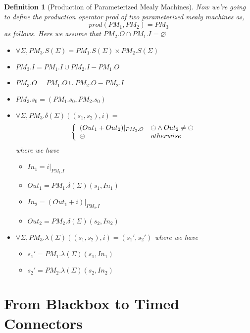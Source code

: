 \documentclass[conference, a4paper]{IEEEtran}
\newtheorem{definition}{Definition}
\newcommand{\rblock}[0]{\circleddash}
\begin{document}
\begin{definition}[Production of Parameterized Mealy Machines]
  Now we're going to define the production operator \emph{prod} of two parameterized mealy machines as,
  \[
  prod(PM_1,PM_2)=PM_3
  \]
  as follows. Here we assume that $PM_2.O\cap PM_1.I=\varnothing$
  \begin{itemize}
  	\item[-] $\forall\Sigma, PM_3.S(\Sigma)=PM_1.S(\Sigma)\times PM_2.S(\Sigma)$
    \item[-] $PM_3.I=PM_1.I\cup PM_2.I-PM_1.O$
    \item[-] $PM_3.O=PM_1.O\cup PM_2.O-PM_2.I$
    \item[-] $PM_3.s_0=(PM_1.s_0, PM_2.s_0)$
    \item[-] $\forall\Sigma, PM_3.\delta(\Sigma)((s_1,s_2), i)=$
      \begin{displaymath}
        \left\{
        \begin{array}[h]{ll}
          (Out_1 + Out_2)|_{PM_3.O} & \rblock\land Out_2\neq\rblock \\
          \rblock & otherwise \\
        \end{array}
        \right.
      \end{displaymath}
      where we have
      \begin{itemize}
        \item[*] $In_1 = i|_{PM_1.I}$
        \item[*] $Out_1 = PM_1.\delta(\Sigma)(s_1,In_1)$
        \item[*] $In_2 = (Out_1 + i)|_{PM_2.I}$
        \item[*] $Out_2 = PM_2.\delta(\Sigma)(s_2,In_2)$
      \end{itemize}
    \item[-] $\forall\Sigma, PM_3.\lambda(\Sigma)((s_1,s_2),i)=(s_1',s_2')$
      where we have
      \begin{itemize}
        \item[*] $s_1' = PM_1.\lambda(\Sigma)(s_1,In_1)$
        \item[*] $s_2' = PM_2.\lambda(\Sigma)(s_2,In_2)$
      \end{itemize}
  \end{itemize}
\end{definition}

\section{From Blackbox to Timed Connectors}
\end{document}
